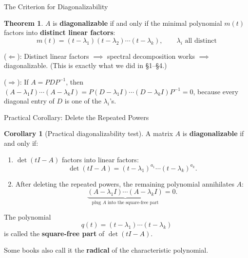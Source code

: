 \documentclass[10pt]{beamer}
\theoremstyle{definition}
\newtheorem{thm}{Theorem}[section]
\newtheorem{cor}{Corollary}[section]
\newcommand{\x}[1]{\alert{\textbf{#1}}}
\begin{document}
\begin{frame}[shrink=5]{The Criterion for Diagonalizability}

\begin{thm}
$A$ is \x{diagonalizable} if and only if the minimal polynomial $m(t)$ factors into \x{distinct linear factors}:
$$m(t) = (t - \lambda_1)(t - \lambda_2)\cdots(t - \lambda_k), \qquad \lambda_i\text{ all distinct}$$
\end{thm}

\vfill\pause

($\Leftarrow$): Distinct linear factors $\implies$ spectral decomposition works $\implies$ diagonalizable. (This is exactly what we did in \S1--\S4.)

\vfill

($\Rightarrow$): If $A = PDP^{-1}$, then $(A - \lambda_1 I)\cdots(A - \lambda_k I) = P(D - \lambda_1 I)\cdots(D - \lambda_k I)P^{-1} = 0$, because every diagonal entry of $D$ is one of the $\lambda_i$'s.

\end{frame}


\begin{frame}[shrink=5]{Practical Corollary: Delete the Repeated Powers}

\begin{cor}[Practical diagonalizability test]
A matrix $A$ is \x{diagonalizable} if and only if:

\begin{enumerate}
\item $\det(tI-A)$ factors into linear factors:
$$\det(tI-A)=(t-\lambda_1)^{a_1}\cdots(t-\lambda_k)^{a_k}.$$

\item After deleting the repeated powers, the remaining polynomial annihilates $A$:
$$\underbrace{(A-\lambda_1 I)\cdots(A-\lambda_k I)}_{\text{plug $A$ into the square-free part}}=0.$$
\end{enumerate}
\end{cor}

\vfill

The polynomial
$$q(t)=(t-\lambda_1)\cdots(t-\lambda_k)$$
is called the \x{square-free part} of $\det(tI-A)$.

\vfill

Some books also call it the \x{radical} of the characteristic polynomial.

\end{frame}
\end{document}
